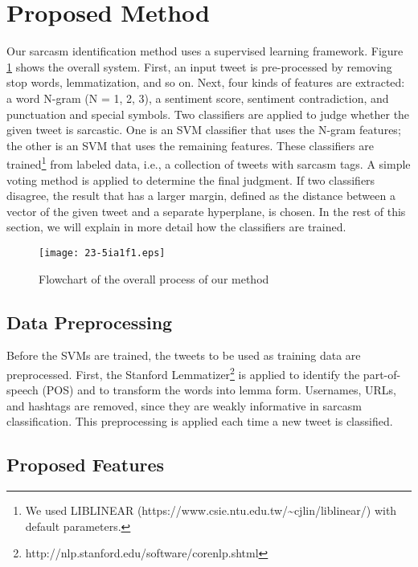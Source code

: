 \documentclass[english]{jnlp_1.4}
\begin{document}
\section{Proposed Method}
\label{sec:proposed method}

Our sarcasm identification method uses a supervised learning framework.
Figure \ref{method_overview} shows the overall system.
First, an input tweet is pre-processed by removing stop words, lemmatization, and so on.
Next, four kinds of features are extracted: a word N-gram (N = 1, 2, 3), a sentiment score, sentiment contradiction, and punctuation and special symbols.
Two classifiers are applied to judge whether the given tweet is sarcastic.
One is an SVM classifier that uses the N-gram features; the other is an SVM that uses the remaining features.
These classifiers are trained\footnote{We used LIBLINEAR (https://www.csie.ntu.edu.tw/\~{}cjlin/liblinear/) with default parameters.} from labeled data, i.e., a collection of tweets with sarcasm tags.
A simple voting method is applied to determine the final judgment.
If two classifiers disagree, the result that has a larger margin, defined as the distance between a vector of the given tweet and a separate hyperplane, is chosen.
In the rest of this section, we will explain in more detail how the classifiers are trained.

\begin{figure}[t]
\begin{center}
\texttt{[image: 23-5ia1f1.eps]}
\end{center}
\caption{Flowchart of the overall process of our method}
\label{method_overview}
\end{figure}


\subsection{Data Preprocessing}

Before the SVMs are trained, the tweets to be used as training data are preprocessed.
First, the Stanford Lemmatizer\footnote{http://nlp.stanford.edu/software/corenlp.shtml} is applied to identify the part-of-speech (POS) and to transform the words into lemma form.
Usernames, URLs, and hashtags are removed, since they are weakly informative in sarcasm classification.
This preprocessing is applied each time a new tweet is classified.


\subsection{Proposed Features}
\label{proposed_features}
\end{document}
